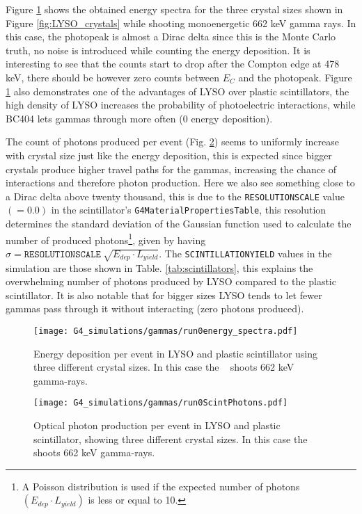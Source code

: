 Figure \ref{fig:LYSO_edep} shows the obtained energy spectra for the three crystal sizes shown in Figure \ref{fig:LYSO_crystals} while shooting monoenergetic 662 \unit{\kilo\eV} gamma rays. In this case, the photopeak is almost a Dirac delta since this is the Monte Carlo truth, no noise is introduced while counting the energy deposition. It is interesting to see that the counts start to drop after the Compton edge at 478 \unit{\kilo\eV}, there should be however zero counts between $E_C$ and the photopeak. Figure \ref{fig:LYSO_edep} also demonstrates one of the advantages of LYSO over plastic scintillators, the high density of LYSO increases the probability of photoelectric interactions, while BC404 lets gammas through more often (0 energy deposition).

The count of photons produced per event (Fig. \ref{fig:LYSO_ScintPhotons}) seems to uniformly increase with crystal size just like the energy deposition, this is expected since bigger crystals produce higher travel paths for the gammas, increasing the chance of interactions and therefore photon production. Here we also see something close to a Dirac delta above twenty thousand, this is due to the \texttt{RESOLUTIONSCALE} value $(=0.0)$ in the scintillator's \texttt{G4MaterialPropertiesTable}, this resolution determines the standard deviation of the Gaussian function used to calculate the number of produced photons\footnote{A Poisson distribution is used if the expected number of photons $(E_{dep}\cdot L_{yield})$ is less or equal to 10.}, given by having $\sigma=\texttt{RESOLUTIONSCALE}~\sqrt{E_{dep}\cdot L_{yield}}$. The \texttt{SCINTILLATIONYIELD} values in the simulation are those shown in Table. \ref{tab:scintillators}, this explains the overwhelming number of photons produced by LYSO compared to the plastic scintillator. It is also notable that for bigger sizes LYSO tends to let fewer gammas pass through it without interacting (zero photons produced).

\begin{figure}
  \centering
  \texttt{[image: G4\_simulations/gammas/run0energy\_spectra.pdf]}
  \caption{\label{fig:LYSO_edep}Energy deposition per event in LYSO and plastic scintillator using three different crystal sizes. In this case the \gps~ shoots 662 \unit{\kilo\eV} gamma-rays.}
\end{figure}

\begin{figure}
  \centering
  \texttt{[image: G4\_simulations/gammas/run0ScintPhotons.pdf]}
  \caption{\label{fig:LYSO_ScintPhotons}Optical photon production per event in LYSO and plastic scintillator, showing three different crystal sizes. In this case the \gps~ shoots 662 \unit{\kilo\eV} gamma-rays.}
\end{figure}

